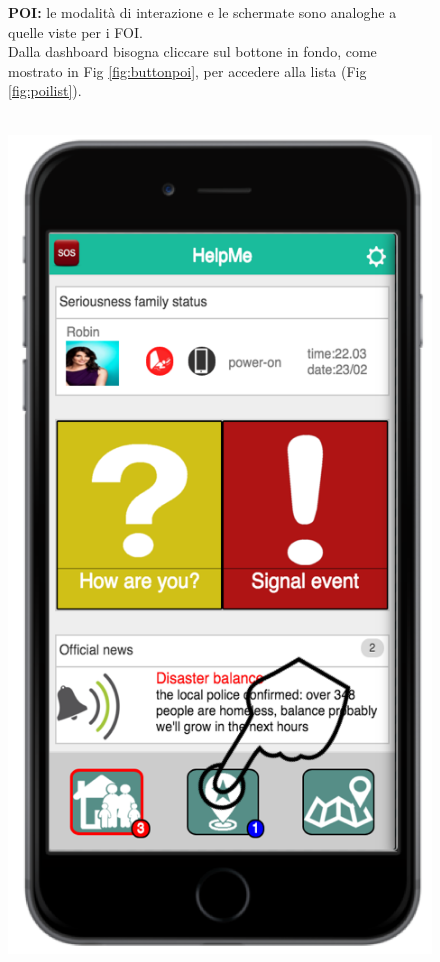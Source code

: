 \begin{figure}
\textbf{ POI:} le modalità di interazione e le schermate sono analoghe a quelle viste per i FOI. \\
Dalla dashboard bisogna cliccare sul bottone in fondo, come mostrato in Fig \ref{fig:buttonpoi}, per accedere alla lista (Fig \ref{fig:poilist}).
 \\ \\
 \begin{minipage}[b]{6cm}
   \centering
	\includegraphics[scale=0.9]{interfaccia/buttonpoi.png}

\end{minipage}
\end{figure}
